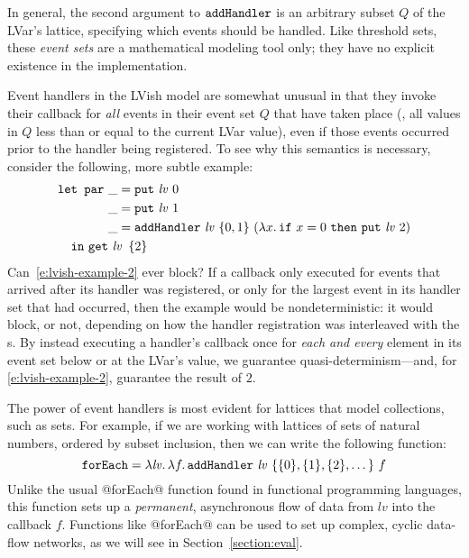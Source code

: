 In general, the second argument to ${\mbox{\texttt{addHandler}}}$ is an arbitrary
subset $Q$ of the LVar's lattice, specifying which events should be
handled.  Like threshold sets, these \emph{event sets} are a
mathematical modeling tool only; they have no explicit existence in
the implementation.

Event handlers in the LVish model are somewhat unusual in that they
invoke their callback for \emph{all} events in their event set $Q$
that have taken place (\ie, all values in $Q$ less than or equal to
the current LVar value), even if those events occurred prior to the
handler being registered.  To see why this semantics is necessary,
consider the following, more subtle example:
\begin{equation}
\begin{split}
& \LETPAR ~\_ = \putexp{\mathit{lv}}{0} \\
&  \letparspace ~\_ = \putexp{\mathit{lv}}{1} \\
&  \letparspace ~\_ = \ADDHANDLER~\mathit{lv}~\{ 0, 1 \}~
     (\lam{x}{\termfont{if}~x=0~\termfont{then}~\putexp{\mathit{lv}}{2}}) \\
&  \letspace \IN~ \getexp{\mathit{lv}}{\setof{2}}
\end{split}
\label{e:lvish-example-2}
\end{equation}
Can~\ref{e:lvish-example-2} ever block?  If a callback only executed
for events that arrived after its handler was registered, or only for
the largest event in its handler set that had occurred, then the
example would be nondeterministic: it would block, or not, depending
on how the handler registration was interleaved with the
s.  By instead executing a handler's callback once for
\emph{each and every} element in its event set below or at the LVar's
value, we guarantee quasi-determinism---and, for
\ref{e:lvish-example-2}, guarantee the result of $2$.

The power of event handlers is most evident for lattices that model
collections, such as sets.  For example, if we are working with
lattices of sets of natural numbers, ordered by subset inclusion, then
we can write the following function:
\[
\termfont{forEach} = \lam{\mathit{lv}}{
  \lam{f}{
    \ADDHANDLER~\mathit{lv}~\{ \{0\}, \{1\}, \{2\}, \dots \}~f
  }}
\]
Unlike the usual @forEach@ function found in functional programming
languages, this function sets up a \emph{permanent}, asynchronous flow
of data from $\mathit{lv}$ into the callback $f$.  Functions like
@forEach@ can be used to set up complex, cyclic data-flow networks, as
we will see in Section~\ref{section:eval}.

